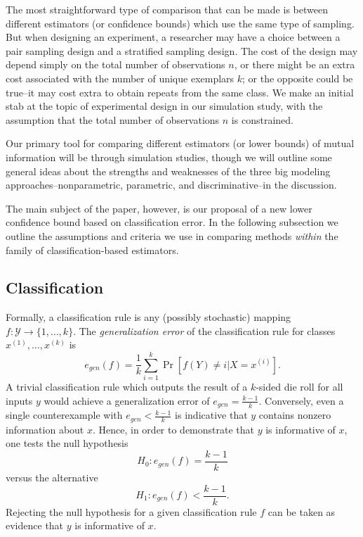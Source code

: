 \documentclass{article}
\begin{document}
The most straightforward type of comparison that can be made is between different estimators (or confidence bounds)  which use the same type of sampling.  But when designing an experiment, a researcher
may have a choice between a pair sampling design and a stratified sampling design.  The cost of the design
may depend simply on the total number of observations $n$, or there might be an extra cost associated with
the number of unique exemplars $k$; or the opposite could be true--it may cost extra to obtain repeats from the same class.  We make an initial stab at the topic of experimental design in our simulation study,
with the assumption that the total number of observations $n$ is constrained.

Our primary tool for comparing different estimators (or lower bounds) of mutual information will be through simulation studies, though we will outline some general ideas about the strengths and weaknesses of the three big modeling approaches--nonparametric, parametric, and discriminative--in the discussion.

The main subject of the paper, however, is our proposal of a new lower confidence bound based on classification error.  In the following subsection we outline the assumptions and criteria we use
in comparing methods \emph{within} the family of classification-based estimators.

\subsection{Classification}

Formally, a classification rule is
any (possibly stochastic) mapping $f: \mathcal{Y} \to \{1,\hdots,
k\}$.  The \emph{generalization error} of the classification rule for classes $x^{(1)},\hdots, x^{(k)}$ is
\[
e_{gen}(f) = \frac{1}{k} \sum_{i=1}^k\Pr[f(Y) \neq i | X = x^{(i)}].
\]
A trivial classification rule which outputs the result of a $k$-sided
die roll for all inputs $y$ would achieve a generalization error of
$e_{gen} = \frac{k-1}{k}$.  Conversely, even a single counterexample
with $e_{gen} < \frac{k-1}{k}$ is indicative that $y$ contains nonzero
information about $x$.  Hence, in order to demonstrate that $y$ is
informative of $x$, one tests the null hypothesis
\[
H_0: e_{gen}(f) = \frac{k-1}{k}
\]
versus the alternative
\[
H_1: e_{gen}(f) < \frac{k-1}{k}.
\]
Rejecting the null hypothesis for a given classification rule $f$ can
be taken as evidence that $y$ is informative of $x$.
\end{document}
